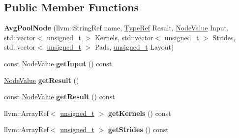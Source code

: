 \subsection*{Public Member Functions}
\begin{DoxyCompactItemize}
\item 
\mbox{\label{classglow_1_1_avg_pool_node_ab1d104d56fc303525297c8f440a0b883}} 
{\bfseries Avg\+Pool\+Node} (llvm\+::\+String\+Ref name, \hyperlink{structglow_1_1_type}{Type\+Ref} Result, \hyperlink{structglow_1_1_node_value}{Node\+Value} Input, std\+::vector$<$ \hyperlink{namespaceglow_a0ca574644e1e42ef193a9947fb4d8911}{unsigned\+\_\+t} $>$ Kernels, std\+::vector$<$ \hyperlink{namespaceglow_a0ca574644e1e42ef193a9947fb4d8911}{unsigned\+\_\+t} $>$ Strides, std\+::vector$<$ \hyperlink{namespaceglow_a0ca574644e1e42ef193a9947fb4d8911}{unsigned\+\_\+t} $>$ Pads, \hyperlink{namespaceglow_a0ca574644e1e42ef193a9947fb4d8911}{unsigned\+\_\+t} Layout)
\item 
\mbox{\label{classglow_1_1_avg_pool_node_a6997d975a1e28352b1a5c4c68027a1fd}} 
const \hyperlink{structglow_1_1_node_value}{Node\+Value} {\bfseries get\+Input} () const
\item 
\mbox{\label{classglow_1_1_avg_pool_node_ab64b552890c3639aba877d3db204413d}} 
\hyperlink{structglow_1_1_node_value}{Node\+Value} {\bfseries get\+Result} ()
\item 
\mbox{\label{classglow_1_1_avg_pool_node_a51ec1ba5e9768b9c490eaf70d792658c}} 
const \hyperlink{structglow_1_1_node_value}{Node\+Value} {\bfseries get\+Result} () const
\item 
\mbox{\label{classglow_1_1_avg_pool_node_aedd008895b8d56670865d337c28cc8d5}} 
llvm\+::\+Array\+Ref$<$ \hyperlink{namespaceglow_a0ca574644e1e42ef193a9947fb4d8911}{unsigned\+\_\+t} $>$ {\bfseries get\+Kernels} () const
\item 
\mbox{\label{classglow_1_1_avg_pool_node_afcf397308aaef165e1b6041bb11cbfa3}} 
llvm\+::\+Array\+Ref$<$ \hyperlink{namespaceglow_a0ca574644e1e42ef193a9947fb4d8911}{unsigned\+\_\+t} $>$ {\bfseries get\+Strides} () const
\item 

\end{DoxyCompactItemize}
